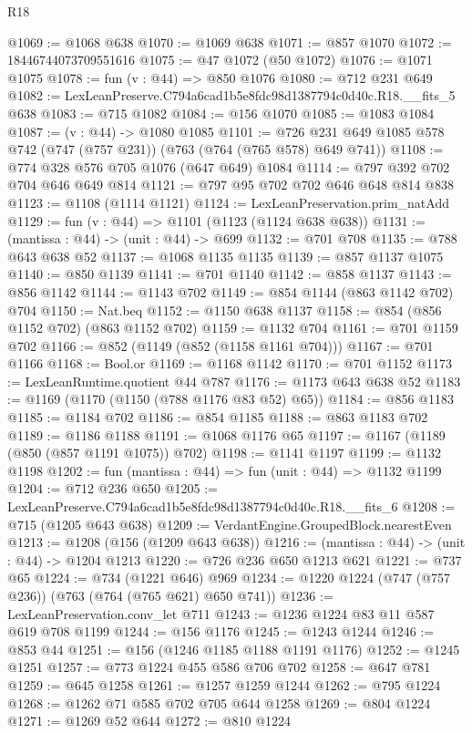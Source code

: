 \begin{lexlean}{R18}
\begin{coremodule}
@1069 := @1068 @638
@1070 := @1069 @638
@1071 := @857 @1070
@1072 := 18446744073709551616
@1075 := @47 @1072 (@50 @1072)
@1076 := @1071 @1075
@1078 := fun (v : @44) => @850 @1076
@1080 := @712 @231 @649
@1082 := LexLeanPreserve.C794a6cad1b5e8fdc98d1387794c0d40c.R18.__fits_5 @638
@1083 := @715 @1082
@1084 := @156 @1070
@1085 := @1083 @1084
@1087 := (v : @44) -> @1080 @1085
@1101 := @726 @231 @649 @1085 @578 @742 (@747 (@757 @231)) (@763 (@764 (@765 @578) @649 @741))
@1108 := @774 @328 @576 @705 @1076 (@647 @649) @1084
@1114 := @797 @392 @702 @704 @646 @649 @814
@1121 := @797 @95 @702 @702 @646 @648 @814 @838
@1123 := @1108 (@1114 @1121)
@1124 := LexLeanPreservation.prim_natAdd
@1129 := fun (v : @44) => @1101 (@1123 (@1124 @638 @638))
@1131 := (mantissa : @44) -> (unit : @44) -> @699
@1132 := @701 @708
@1135 := @788 @643 @638 @52
@1137 := @1068 @1135 @1135
@1139 := @857 @1137 @1075
@1140 := @850 @1139
@1141 := @701 @1140
@1142 := @858 @1137
@1143 := @856 @1142
@1144 := @1143 @702
@1149 := @854 @1144 (@863 @1142 @702) @704
@1150 := Nat.beq
@1152 := @1150 @638 @1137
@1158 := @854 (@856 @1152 @702) (@863 @1152 @702)
@1159 := @1132 @704
@1161 := @701 @1159 @702
@1166 := @852 (@1149 (@852 (@1158 @1161 @704)))
@1167 := @701 @1166
@1168 := Bool.or
@1169 := @1168 @1142
@1170 := @701 @1152
@1173 := LexLeanRuntime.quotient @44 @787
@1176 := @1173 @643 @638 @52
@1183 := @1169 (@1170 (@1150 (@788 @1176 @83 @52) @65))
@1184 := @856 @1183
@1185 := @1184 @702
@1186 := @854 @1185
@1188 := @863 @1183 @702
@1189 := @1186 @1188
@1191 := @1068 @1176 @65
@1197 := @1167 (@1189 (@850 (@857 @1191 @1075)) @702)
@1198 := @1141 @1197
@1199 := @1132 @1198
@1202 := fun (mantissa : @44) => fun (unit : @44) => @1132 @1199
@1204 := @712 @236 @650
@1205 := LexLeanPreserve.C794a6cad1b5e8fdc98d1387794c0d40c.R18.__fits_6
@1208 := @715 (@1205 @643 @638)
@1209 := VerdantEngine.GroupedBlock.nearestEven
@1213 := @1208 (@156 (@1209 @643 @638))
@1216 := (mantissa : @44) -> (unit : @44) -> @1204 @1213
@1220 := @726 @236 @650 @1213 @621
@1221 := @737 @65
@1224 := @734 (@1221 @646) @969
@1234 := @1220 @1224 (@747 (@757 @236)) (@763 (@764 (@765 @621) @650 @741))
@1236 := LexLeanPreservation.conv_let @711
@1243 := @1236 @1224 @83 @11 @587 @619 @708 @1199
@1244 := @156 @1176
@1245 := @1243 @1244
@1246 := @853 @44
@1251 := @156 (@1246 @1185 @1188 @1191 @1176)
@1252 := @1245 @1251
@1257 := @773 @1224 @455 @586 @706 @702
@1258 := @647 @781
@1259 := @645 @1258
@1261 := @1257 @1259 @1244
@1262 := @795 @1224
@1268 := @1262 @71 @585 @702 @705 @644 @1258
@1269 := @804 @1224
@1271 := @1269 @52 @644
@1272 := @810 @1224

\end{coremodule}
\end{lexlean}
